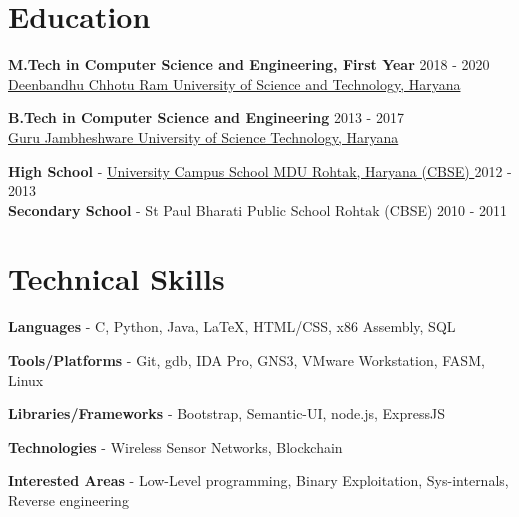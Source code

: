 \documentclass[margin, centered]{res}
\begin{document}
\begin{resume}

\section{Education}

\textbf{M.Tech in Computer Science and Engineering, First Year} \hfill 2018 - 2020 \\
\href{http://dcrustm.ac.in//}{Deenbandhu Chhotu Ram University of Science and Technology, Haryana}

\textbf{B.Tech in Computer Science and Engineering} \hfill 2013 - 2017 \\
\href{http://www.gjust.ac.in/}{Guru Jambheshware University of Science Technology, Haryana}

\textbf{High School} - \href{http://www.mdurohtak.ac.in/info/campusschool.html/} {University Campus School MDU Rohtak, Haryana (CBSE) } \hfill 2012 - 2013 \\
\textbf{Secondary School} - St Paul Bharati Public School Rohtak (CBSE)  \hfill 2010 - 2011 \\
\vspace{3mm}
\section{Technical \hspace{2mm} Skills}

\textbf{Languages} - C, Python, Java, \LaTeX, HTML/CSS, x86 Assembly, SQL

\textbf{Tools/Platforms} - Git, gdb, IDA Pro, GNS3, VMware Workstation, FASM, Linux

\textbf{Libraries/Frameworks} - Bootstrap, Semantic-UI, node.js, ExpressJS

\textbf{Technologies} - Wireless Sensor Networks, Blockchain

\textbf{Interested Areas} - Low-Level programming, Binary Exploitation, Sys-internals, Reverse engineering 
\vspace{4mm}



\end{resume}
\end{document}
